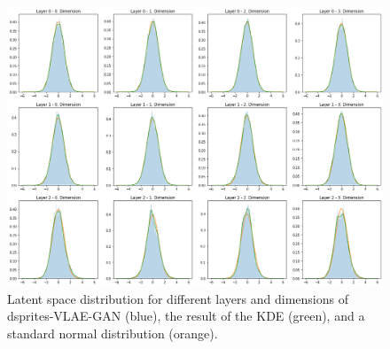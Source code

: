 \begin{figure}[H]
    \centering
    \includegraphics[width=\textwidth]{images/generated_vs_true/dsprites/vlae_gan_kde.png}
    \caption[dsprites-VLAE-GAN - Estimated Latent Space Distribution]{Latent space distribution for different layers and dimensions of dsprites-\ac{VLAE}-\ac{GAN} (blue), the result of the \ac{KDE} (green), and a standard normal distribution (orange).}
\end{figure}